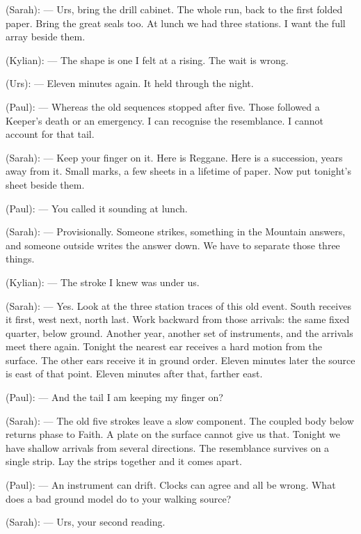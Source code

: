 
\begin{room}

(Sarah): --- Urs, bring the drill cabinet. The whole run, back to the first folded paper. Bring the great seals too. At lunch we had three stations. I want the full array beside them.

(Kylian): --- The shape is one I felt at a rising. The wait is wrong.

(Urs): --- Eleven minutes again. It held through the night.

(Paul): --- Whereas the old sequences stopped after five. Those followed a Keeper's death or an emergency. I can recognise the resemblance. I cannot account for that tail.

(Sarah): --- Keep your finger on it. Here is Reggane. Here is a succession, years away from it. Small marks, a few sheets in a lifetime of paper. Now put tonight's sheet beside them.

(Paul): --- You called it sounding at lunch.

(Sarah): --- Provisionally. Someone strikes, something in the Mountain answers, and someone outside writes the answer down. We have to separate those three things.

(Kylian): --- The stroke I knew was under us.

(Sarah): --- Yes. Look at the three station traces of this old event. South receives it first, west next, north last. Work backward from those arrivals: the same fixed quarter, below ground. Another year, another set of instruments, and the arrivals meet there again. Tonight the nearest ear receives a hard motion from the surface. The other ears receive it in ground order. Eleven minutes later the source is east of that point. Eleven minutes after that, farther east.

(Paul): --- And the tail I am keeping my finger on?

(Sarah): --- The old five strokes leave a slow component. The coupled body below returns phase to Faith. A plate on the surface cannot give us that. Tonight we have shallow arrivals from several directions. The resemblance survives on a single strip. Lay the strips together and it comes apart.

(Paul): --- An instrument can drift. Clocks can agree and all be wrong. What does a bad ground model do to your walking source?

(Sarah): --- Urs, your second reading.


\end{room}
